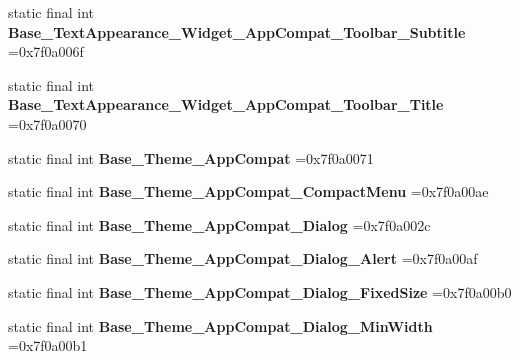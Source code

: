 \begin{DoxyCompactItemize}
\mbox{\label{classproject4_1_1xaria_1_1R_1_1style_ae55d57713ff9bc6522fc93198aa1edf2}} 
static final int {\bfseries Base\+\_\+\+Text\+Appearance\+\_\+\+Widget\+\_\+\+App\+Compat\+\_\+\+Toolbar\+\_\+\+Subtitle} =0x7f0a006f
\item 
\mbox{\label{classproject4_1_1xaria_1_1R_1_1style_ab53bb6b66b3c04d44bfa0773d7421ebe}} 
static final int {\bfseries Base\+\_\+\+Text\+Appearance\+\_\+\+Widget\+\_\+\+App\+Compat\+\_\+\+Toolbar\+\_\+\+Title} =0x7f0a0070
\item 
\mbox{\label{classproject4_1_1xaria_1_1R_1_1style_a90d3e38ef9199b2c397b4e518587d0b5}} 
static final int {\bfseries Base\+\_\+\+Theme\+\_\+\+App\+Compat} =0x7f0a0071
\item 
\mbox{\label{classproject4_1_1xaria_1_1R_1_1style_ad7921eb69065162f4bc908172fc8023a}} 
static final int {\bfseries Base\+\_\+\+Theme\+\_\+\+App\+Compat\+\_\+\+Compact\+Menu} =0x7f0a00ae
\item 
\mbox{\label{classproject4_1_1xaria_1_1R_1_1style_a9031cf4a1d101e706cb2186e4b575c78}} 
static final int {\bfseries Base\+\_\+\+Theme\+\_\+\+App\+Compat\+\_\+\+Dialog} =0x7f0a002c
\item 
\mbox{\label{classproject4_1_1xaria_1_1R_1_1style_a51923da15c7a91c83fe00b3d3c1cfe3b}} 
static final int {\bfseries Base\+\_\+\+Theme\+\_\+\+App\+Compat\+\_\+\+Dialog\+\_\+\+Alert} =0x7f0a00af
\item 
\mbox{\label{classproject4_1_1xaria_1_1R_1_1style_acc7f90e3d8eba2781df04e4194ca7557}} 
static final int {\bfseries Base\+\_\+\+Theme\+\_\+\+App\+Compat\+\_\+\+Dialog\+\_\+\+Fixed\+Size} =0x7f0a00b0
\item 
\mbox{\label{classproject4_1_1xaria_1_1R_1_1style_a2ae0427687f50b671d631615e03ac626}} 
static final int {\bfseries Base\+\_\+\+Theme\+\_\+\+App\+Compat\+\_\+\+Dialog\+\_\+\+Min\+Width} =0x7f0a00b1
\item 

\end{DoxyCompactItemize}
